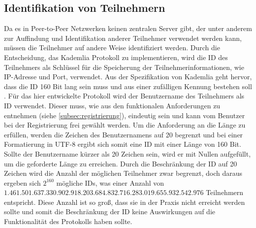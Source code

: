 \subsection{Identifikation von Teilnehmern}
\label{subsec:identifikation_von_teilnehmern}

Da es in Peer-to-Peer Netzwerken keinen zentralen Server gibt, der unter anderem zur Auffindung und Identifikation anderer Teilnehmer verwendet werden kann, müssen die Teilnehmer auf andere Weise identifiziert werden. Durch die Entscheidung, das Kademlia Protokoll zu implementieren, wird die ID des Teilnehmers als Schlüssel für die Speicherung der Teilnehmerinformationen, wie IP-Adresse und Port, verwendet.
Aus der Spezifikation von Kademlia geht hervor, dass die ID 160 Bit lang sein muss und aus einer zufälligen Kennung bestehen soll \parencite[S. 2]{Maymounkov_Kademlia}. Für das hier entwickelte Protokoll wird der Benutzername des Teilnehmers als ID verwendet. Dieser muss, wie aus den funktionalen Anforderungen zu entnehmen (siehe \ref{subsec:registrierung}), eindeutig sein und kann vom Benutzer bei der Registrierung frei gewählt werden. Um die Anforderung an die Länge zu erfüllen, werden die Zeichen des Benutzernamens auf 20 begrenzt und bei einer Formatierung in UTF-8 ergibt sich somit eine ID mit einer Länge von 160 Bit. Sollte der Benutzername kürzer als 20 Zeichen sein, wird er mit Nullen aufgefüllt, um die geforderte Länge zu erreichen.
Durch die Beschränkung der ID auf 20 Zeichen wird die Anzahl der möglichen Teilnehmer zwar begrenzt, doch daraus ergeben sich $2^{160}$ mögliche IDs, was einer Anzahl von $1.461.501.637.330.902.918.203.684.832.716.283.019.655.932.542.976$ Teilnehmern entspricht. Diese Anzahl ist so groß, dass sie in der Praxis nicht erreicht werden sollte und somit die Beschränkung der ID keine Auswirkungen auf die Funktionalität des Protokolls haben sollte.


